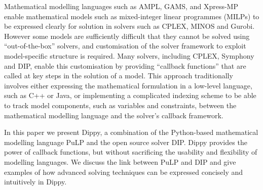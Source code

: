 Mathematical modelling languages such as AMPL, GAMS, and Xpress-MP enable mathematical models such as mixed-integer linear programmes (MILPs) to be expressed clearly for solution in solvers such as CPLEX, MINOS and Gurobi.
However some models are sufficiently difficult that they cannot be solved using ``out-of-the-box'' solvers, and customisation of the solver framework to exploit model-specific structure is required.
Many solvers, including CPLEX, Symphony and DIP, enable this customisation by providing ``callback functions'' that are called at key steps in the solution of a model.
This approach traditionally involves either expressing the mathematical formulation in a low-level language, such as C++ or Java, or implementing a complicated indexing scheme to be able to track model components, such as variables and constraints, between the mathematical modelling language and the solver's callback framework.

In this paper we present Dippy, a combination of the Python-based mathematical modelling language PuLP and the open source solver DIP. 
Dippy provides the power of callback functions, but without sacrificing the usability and flexibility of modelling languages.
We discuss the link between PuLP and DIP and give examples of how advanced solving techniques can be expressed concisely and intuitively in Dippy.